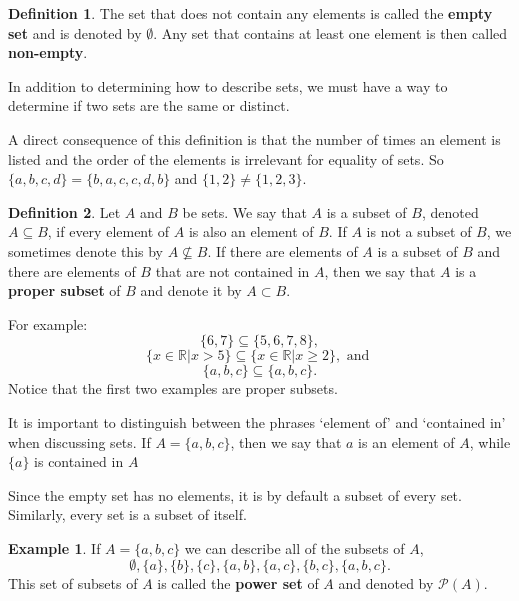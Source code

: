 \documentclass[
]{book}
\theoremstyle{definition}
\newtheorem{definition}{Definition}[chapter]
\theoremstyle{definition}
\newtheorem{example}{Example}[chapter]
\theoremstyle{definition}
\theoremstyle{remark}
\begin{document}
\begin{definition}
\protect\hypertarget{def:unnamed-chunk-7}{}{\label{def:unnamed-chunk-7} } The set that does not contain any elements is called the \textbf{empty set} and is denoted by \(\emptyset\). Any set that contains at least one element is then called \textbf{non-empty}.
\end{definition}

In addition to determining how to describe sets, we must have a way to determine if two sets are the same or distinct.

A direct consequence of this definition is that the number of times an element is listed and the order of the elements is irrelevant for equality of sets. So \(\{a, b, c, d\}=\{b, a, c, c, d, b\}\) and \(\{1, 2\} \neq \{1, 2, 3\}\).

\begin{definition}
\protect\hypertarget{def:subset}{}{\label{def:subset} } Let \(A\) and \(B\) be sets. We say that \(A\) is a subset of \(B\), denoted \(A \subseteq B\), if every element of \(A\) is also an element of \(B\). If \(A\) is not a subset of \(B\), we sometimes denote this by \(A\nsubseteq B\). If there are elements of \(A\) is a subset of \(B\) and there are elements of \(B\) that are not contained in \(A\), then we say that \(A\) is a \textbf{proper subset} of \(B\) and denote it by \(A\subset B\).
\end{definition}

For example:
\[\{6, 7 \} \subseteq \{5, 6, 7, 8\},\]
\[\{x\in \mathbb{R} \vert x>5\} \subseteq \{x\in \mathbb{R} \vert x \geq 2\}, \mbox{ and }\]
\[ \{a,b,c\} \subseteq \{a,b,c\}. \]
Notice that the first two examples are proper subsets.

It is important to distinguish between the phrases `element of' and `contained in' when discussing sets. If \(A= \{a,b,c\}\), then we say that \(a\) is an element of \(A\), while \(\{a\}\) is contained in \(A\)

Since the empty set has no elements, it is by default a subset of every set. Similarly, every set is a subset of itself.

\begin{example}
\protect\hypertarget{exm:unnamed-chunk-8}{}{\label{exm:unnamed-chunk-8} } If \(A=\{a,b,c\}\) we can describe all of the subsets of \(A\),
\[ \emptyset, \{a\}, \{b\}, \{c\}, \{a,b\}, \{a,c\}, \{b,c\}, \{a, b, c\}.\]
This set of subsets of \(A\) is called the \textbf{power set} of \(A\) and denoted by \(\mathcal{P}(A)\).
\end{example}
\end{document}
